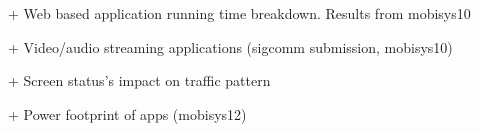 	+ Web based application running time breakdown. Results from mobisys10
	

	+ Video/audio streaming applications (sigcomm submission, mobisys10)
%
%
%



	+ Screen status's impact on traffic pattern

	+ Power footprint of apps (mobisys12)
	
	
